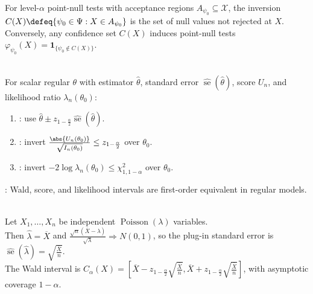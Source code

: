 \begin{remark} \label{rem:duality-acceptance-regions} \\
For level-$\alpha$ point-null tests with acceptance regions $A_{\psi_0}\subseteq\mathcal{X}$, the inversion $C(X)\defeq\{\psi_0\in\Psi:X\in A_{\psi_0}\}$ is the set of null values not rejected at $X$. Conversely, any confidence set $C(X)$ induces point-null tests $\varphi_{\psi_0}(X)=\mathbf{1}_{\{\psi_0\notin C(X)\}}$.
\end{remark}

\begin{definition} \label{def:wald-score-likelihood-intervals} \\
For scalar regular $\theta$ with estimator $\widehat{\theta}$, standard error $\widehat{\operatorname{se}}(\widehat{\theta})$, score $U_n$, and likelihood ratio $\lambda_n(\theta_0)$:
\begin{enumerate}[label=(\roman*)]
\setlength{\itemsep}{0pt}
\item {}: use $\widehat{\theta}\pm z_{1-\frac{\alpha}{2}}\widehat{\operatorname{se}}(\widehat{\theta})$.
\item {}: invert $\frac{\abs{U_n(\theta_0)}}{\sqrt{I_n(\theta_0)}}\leq z_{1-\frac{\alpha}{2}}$ over $\theta_0$.
\item {}: invert $-2\log\lambda_n(\theta_0)\leq\chi^2_{1,1-\alpha}$ over $\theta_0$.
\end{enumerate}
: Wald, score, and likelihood intervals are first-order equivalent in regular models.
\end{definition}

\begin{example} \label{ex:poisson-mle-wald-confidence-interval} \\
Let $X_1,\ldots,X_n$ be independent $\operatorname{Poisson}(\lambda)$ variables.\\
Then $\widehat{\lambda}=\overline{X}$ and $\frac{\sqrt n(\overline{X}-\lambda)}{\sqrt{\lambda}}\Rightarrow N(0,1)$, so the plug-in standard error is $\widehat{\operatorname{se}}(\widehat{\lambda})=\sqrt{\frac{\overline{X}}{n}}$.\\
The Wald interval is $C_\alpha(X)=[\overline{X}-z_{1-\frac{\alpha}{2}}\sqrt{\frac{\overline{X}}{n}},\overline{X}+z_{1-\frac{\alpha}{2}}\sqrt{\frac{\overline{X}}{n}}]$, with asymptotic coverage $1-\alpha$.
\end{example}
